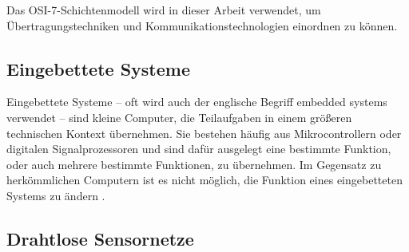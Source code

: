 \begin{table}[htbp]
\caption{OSI-7-Schichtenmodell}
\label{tab:OSI-7-Schichtenmodell}
\end{table}

Das OSI-7-Schichtenmodell wird in dieser Arbeit verwendet, um Übertragungstechniken und Kommunikationstechnologien einordnen zu können.

\subsection{Eingebettete Systeme}

Eingebettete Systeme  -- oft wird auch der englische Begriff embedded systems verwendet -- sind kleine Computer, die Teilaufgaben in einem größeren technischen Kontext übernehmen. Sie bestehen häufig aus Mikrocontrollern oder digitalen Signalprozessoren und sind dafür ausgelegt eine bestimmte Funktion, oder auch mehrere bestimmte Funktionen, zu übernehmen. Im Gegensatz zu herkömmlichen Computern ist es nicht möglich, die Funktion eines eingebetteten Systems zu ändern \cite{Heath:EmbeddedSystemsDesign}.

\subsection{Drahtlose Sensornetze}

